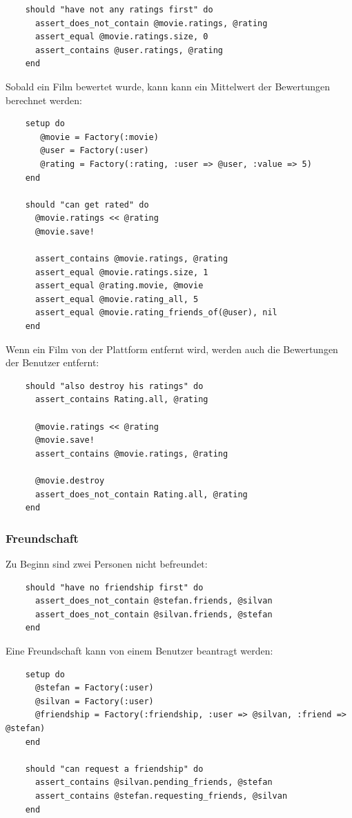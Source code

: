 \begin{verbatim}
    should "have not any ratings first" do
      assert_does_not_contain @movie.ratings, @rating
      assert_equal @movie.ratings.size, 0
      assert_contains @user.ratings, @rating
    end
\end{verbatim}

Sobald ein Film bewertet wurde, kann kann ein Mittelwert der Bewertungen
berechnet werden:

\begin{verbatim}
    setup do
       @movie = Factory(:movie)
       @user = Factory(:user)
       @rating = Factory(:rating, :user => @user, :value => 5)
    end
    
    should "can get rated" do
      @movie.ratings << @rating
      @movie.save!
      
      assert_contains @movie.ratings, @rating
      assert_equal @movie.ratings.size, 1
      assert_equal @rating.movie, @movie
      assert_equal @movie.rating_all, 5
      assert_equal @movie.rating_friends_of(@user), nil
    end
\end{verbatim}

Wenn ein Film von der Plattform entfernt wird, werden auch die Bewertungen
der Benutzer entfernt:

\begin{verbatim}
    should "also destroy his ratings" do
      assert_contains Rating.all, @rating
      
      @movie.ratings << @rating
      @movie.save!
      assert_contains @movie.ratings, @rating
      
      @movie.destroy
      assert_does_not_contain Rating.all, @rating
    end
\end{verbatim}

\subsubsection{Freundschaft}
Zu Beginn sind zwei Personen nicht befreundet:

\begin{verbatim}
    should "have no friendship first" do
      assert_does_not_contain @stefan.friends, @silvan
      assert_does_not_contain @silvan.friends, @stefan
    end
\end{verbatim}

Eine Freundschaft kann von einem Benutzer beantragt werden:

\begin{verbatim}
    setup do
      @stefan = Factory(:user)
      @silvan = Factory(:user)
      @friendship = Factory(:friendship, :user => @silvan, :friend => @stefan)
    end
    
    should "can request a friendship" do
      assert_contains @silvan.pending_friends, @stefan
      assert_contains @stefan.requesting_friends, @silvan
    end
\end{verbatim}


